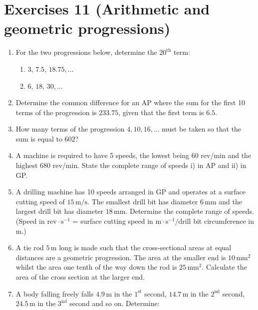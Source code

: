 \documentclass[
  12pt,
  oneside]{book}
\providecommand{\tightlist}{%
  \setlength{\itemsep}{0pt}\setlength{\parskip}{0pt}}
\theoremstyle{definition}
\theoremstyle{definition}
\theoremstyle{definition}
\theoremstyle{definition}
\theoremstyle{remark}
\begin{document}
\hypertarget{exercises-11-arithmetic-and-geometric-progressions}{%
\chapter*{Exercises 11 (Arithmetic and geometric progressions)}\label{exercises-11-arithmetic-and-geometric-progressions}}

\begin{enumerate}
\def\labelenumi{\arabic{enumi}.}
\item
  For the two progressions below, determine the \(20^{\mathrm{th}}\) term:

  \begin{enumerate}
  \def\labelenumii{\roman{enumii})}
  \tightlist
  \item
    \(3,\,7.5,\,18.75,\dots\)
  \item
    \(6,\,18,\,30,\dots\)
  \end{enumerate}
\item
  Determine the common difference for an AP where the sum for the first 10 terms of the progression is \(233.75\), given that the first term is \(6.5\).
\item
  How many terms of the progression \(4,10,16,\dots\) must be taken so that the sum is equal to \(602\)?
\item
  A machine is required to have 5 speeds, the lowest being 60 rev/min and the highest 680 rev/min. State the complete range of speeds i) in AP and ii) in GP.
\item
  A drilling machine has 10 speeds arranged in GP and operates at a surface cutting speed of \(15\,\mathrm{m/s}\). The smallest drill bit has diameter \(6\,\mathrm{mm}\) and the largest drill bit has diameter \(18\,\mathrm{mm}\). Determine the complete range of speeds. (Speed in \(\mathrm{rev}\cdot\mathrm{s}^{-1}\) = surface cutting speed in \(\mathrm{m}\cdot\mathrm{s}^{-1}/\)drill bit circumference in \(\mathrm{m}\).)
\item
  A tie rod \(5\,\mathrm{m}\) long is made such that the cross-sectional areas at equal distances are a geometric progression. The area at the smaller end is \(10\,\mathrm{mm}^2\) whilst the area one tenth of the way down the rod is \(25\,\mathrm{mm}^2\). Calculate the area of the cross section at the larger end.
\item
  A body falling freely falls \(4.9\,\mathrm{m}\) in the \(1^{\mathrm{st}}\) second, \(14.7\,\mathrm{m}\) in the \(2^{\mathrm{nd}}\) second, \(24.5\,\mathrm{m}\) in the \(3^{\mathrm{nd}}\) second and so on. Determine:


\end{enumerate}
\end{document}
